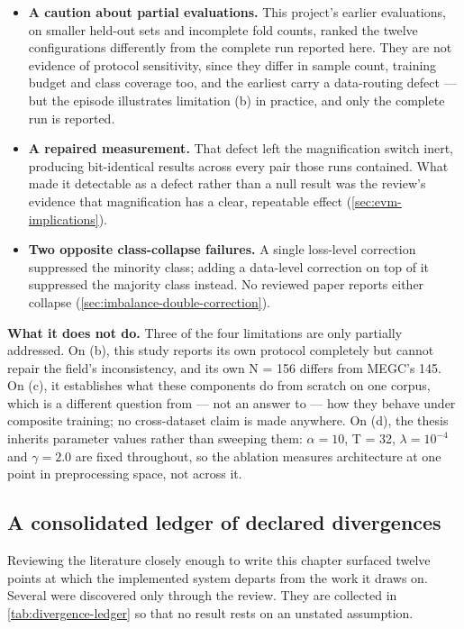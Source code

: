 \begin{itemize}
	\item \textbf{A caution about partial evaluations.} This project's earlier evaluations, on smaller held-out sets and incomplete fold counts, ranked the twelve configurations differently from the complete run reported here. They are not evidence of protocol sensitivity, since they differ in sample count, training budget and class coverage too, and the earliest carry a data-routing defect --- but the episode illustrates limitation (b) in practice, and only the complete run is reported.
	\item \textbf{A repaired measurement.} That defect left the magnification switch inert, producing bit-identical results across every pair those runs contained. What made it detectable as a defect rather than a null result was the review's evidence that magnification has a clear, repeatable effect (\autoref{sec:evm-implications}).
	\item \textbf{Two opposite class-collapse failures.} A single loss-level correction suppressed the minority class; adding a data-level correction on top of it suppressed the majority class instead. No reviewed paper reports either collapse (\autoref{sec:imbalance-double-correction}).
\end{itemize}

\textbf{What it does not do.} Three of the four limitations are only partially addressed. On (b), this study reports its own protocol completely but cannot repair the field's inconsistency, and its own N = 156 differs from MEGC's 145. On (c), it establishes what these components do from scratch on one corpus, which is a different question from --- not an answer to --- how they behave under composite training; no cross-dataset claim is made anywhere. On (d), the thesis inherits parameter values rather than sweeping them: $\alpha = 10$, T = 32, $\lambda = 10^{-4}$ and $\gamma = 2.0$ are fixed throughout, so the ablation measures architecture at one point in preprocessing space, not across it.

\subsection{A consolidated ledger of declared divergences}
\label{sec:divergence-ledger}

Reviewing the literature closely enough to write this chapter surfaced twelve points at which the implemented system departs from the work it draws on. Several were discovered only through the review. They are collected in \autoref{tab:divergence-ledger} so that no result rests on an unstated assumption.

